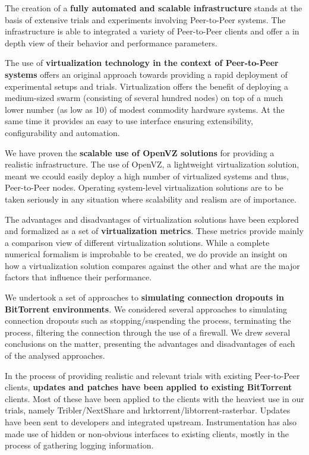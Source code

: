 The creation of a \textbf{fully automated and scalable infrastructure} stands
at the basis of extensive trials and experiments involving Peer-to-Peer
systems. The infrastructure is able to integrated a variety of Peer-to-Peer
clients and offer a in depth view of their behavior and performance
parameters.

The use of \textbf{virtualization technology in the context of Peer-to-Peer
systems} offers an original approach towards providing a rapid deployment of
experimental setups and trials. Virtualization offers the benefit of deploying
a medium-sized swarm (consisting of several hundred nodes) on top of a much
lower number (as low as 10) of modest commodity hardware systems. At the same
time it provides an easy to use interface ensuring extensibility,
configurability and automation.

We have proven the \textbf{scalable use of OpenVZ solutions} for providing a
realistic infrastructure. The use of OpenVZ, a lightweight virtualization
solution, meant we ccould easily deploy a high number of virtualized systems
and thus, Peer-to-Peer nodes. Operating system-level virtualization solutions
are to be taken seriously in any situation where scalability and realism are
of importance.

The advantages and disadvantages of virtualization solutions have been
explored and formalized as a set of \textbf{virtualization metrics}. These
metrics provide mainly a comparison view of different virtualization
solutions. While a complete numerical formalism is improbable to be created,
we do provide an insight on how a virtualization solution compares against the
other and what are the major factors that influence their performance.

We undertook a set of approaches to \textbf{simulating connection dropouts in
BitTorrent environments}. We considered several approaches to simulating
connection dropouts such as stopping/suspending the process, terminating the
process, filtering the connection through the use of a firewall. We drew
several conclusions on the matter, presenting the advantages and disadvantages
of each of the analysed approaches.

In the process of providing realistic and relevant trials with existing
Peer-to-Peer clients, \textbf{updates and patches have been applied to
existing BitTorrent} clients. Most of these have been applied to the clients
with the heaviest use in our trials, namely Tribler/NextShare and
hrktorrent/libtorrent-rasterbar. Updates have been sent to developers and
integrated upstream. Instrumentation has also made use of hidden or
non-obvious interfaces to existing clients, mostly in the process of gathering
logging information.

